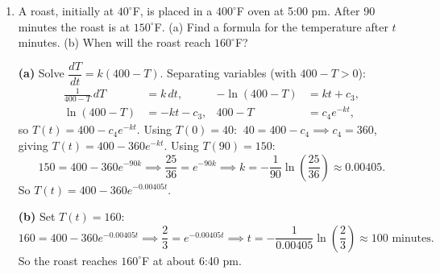 \documentclass[10pt]{article}
\begin{document}
\begin{enumerate}[leftmargin=*, label=\numbox{\arabic*}, resume]
\item
    \begin{problem}[\vspace{7cm}]
        A roast, initially at \(40^\circ\)F, is placed in a \(400^\circ\)F oven at 5:00 pm. After
        90 minutes the roast is at \(150^\circ\)F.
        (a) Find a formula for the temperature after \(t\) minutes.
        (b) When will the roast reach \(160^\circ\)F?
    \end{problem}
    \begin{solution}
        \textbf{(a)} Solve \(\dfrac{dT}{dt} = k(400 - T)\). Separating variables (with \(400 - T > 0\)):
        \[
        \begin{aligned}
            \frac{1}{400 - T}\,dT &= k\,dt, &
            -\ln(400 - T) &= kt + c_3, \\
            \ln(400 - T) &= -kt - c_3, &
            400 - T &= c_4 e^{-kt},
        \end{aligned}
        \]
        so \(T(t) = 400 - c_4 e^{-kt}\). Using \(T(0) = 40\):
        \(\ 40 = 400 - c_4 \implies c_4 = 360\), giving \(T(t) = 400 - 360 e^{-kt}\).
        Using \(T(90) = 150\):
        \[
            150 = 400 - 360 e^{-90k}
            \implies \frac{25}{36} = e^{-90k}
            \implies k = -\frac{1}{90}\ln\!\left(\frac{25}{36}\right) \approx 0.00405.
        \]
        So \(T(t) = 400 - 360 e^{-0.00405 t}\).

        \textbf{(b)} Set \(T(t) = 160\):
        \[
            160 = 400 - 360 e^{-0.00405 t}
            \implies \frac{2}{3} = e^{-0.00405 t}
            \implies t = -\frac{1}{0.00405}\ln\!\left(\frac{2}{3}\right) \approx 100 \text{ minutes.}
        \]
        So the roast reaches \(160^\circ\)F at about 6:40 pm.
    \end{solution}

\end{enumerate}
\end{document}
